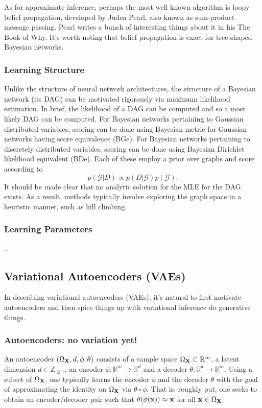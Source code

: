 \documentclass[11pt]{article}
\begin{document}
As for approximate inference, perhaps the most well known algorithm is loopy belief propagation, developed by Judea Pearl, also known as sum-product message passing. Pearl writes a bunch of interesting things about it in his The Book of Why. It's worth noting that belief propagation is exact for tree-shaped Bayesian networks.

\subsubsection{\TODO Learning Structure}
Unlike the structure of neural network architectures, the structure of a Bayesian network (its DAG) can be motivated rigorously via maximum likelihood estimation. In brief, the likelihood of a DAG can be computed and so a most likely DAG can be computed. For Bayesian networks pertaining to Gaussian distributed variables, scoring can be done using Bayesian metric for Gaussian networks having score equivalence (BGe). For Bayesian networks pertaining to discretely distributed variables, scoring can be done using Bayesian Dirichlet likelihood equivalent (BDe). Each of these employ a prior over graphs and score according to
$$
p(\mathcal{G}|D)
\propto
p(D|\mathcal{G})p(\mathcal{G}).
$$
It should be made clear that no analytic solution for the MLE for the DAG exists. As a result, methods typically involve exploring the graph space in a heuristic manner, such as hill climbing.

\subsubsection{\TODO Learning Parameters}
\dots

\subsection{Variational Autoencoders (VAEs)}
In describing variational autoencoders (VAEs), it's natural to first motivate autoencoders and then spice things up with variational inference do generative things.

\subsubsection{Autoencoders: no variation yet!}
\label{sec:autoencoders}
An autoencoder $(\Omega_{\mathbf{X}},d,\phi,\theta)$ consists of a sample space $\Omega_{\mathbf{X}}\subset\mathbb{R}^m$, a latent dimension $d\in\mathbb{Z}_{\geq1}$, an encoder $\phi:\mathbb{R}^m\to\mathbb{R}^d$ and a decoder $\theta:\mathbb{R}^d\to\mathbb{R}^m$. Using a subset of $\Omega_{\mathbf{X}}$, one typically learns the encoder $\phi$ and the decoder $\theta$ with the goal of approximating the identity on $\Omega_{\mathbf{X}}$ via $\theta\circ \phi$. That is, roughly put, one seeks to obtain an encoder/decoder pair such that $\theta(\phi(\mathbf{x}))\approx\mathbf{x}$ for all $\mathbf{x}\in\Omega_{\mathbf{X}}$.
\end{document}
